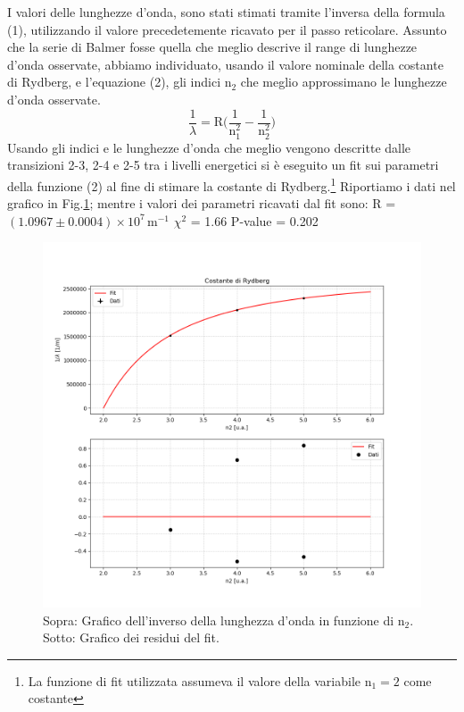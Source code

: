 \documentclass[10pt,a4paper]{article}
\begin{document}
\noindent I valori delle lunghezze d'onda, sono stati stimati tramite l'inversa della formula (1), utilizzando il valore precedetemente ricavato per il passo reticolare. \newline
Assunto che la serie di Balmer fosse quella che meglio descrive il range di lunghezze d'onda osservate, abbiamo individuato, usando il valore nominale della costante di Rydberg, e l'equazione (2), gli indici $\mathrm{n_2}$ che meglio approssimano le lunghezze d'onda osservate.
\begin{equation}
    \frac{1}{\lambda}=\mathrm{R}\biggl(\frac{1}{\mathrm{n_1^2}} - \frac{1}{\mathrm{n_2^2}}\biggr)
\end{equation}
Usando gli indici e le lunghezze d'onda che meglio vengono descritte dalle transizioni 2-3, 2-4 e 2-5 tra i livelli energetici si è eseguito un fit sui parametri della funzione (2) al fine di stimare la costante di Rydberg.\footnote{La funzione di fit utilizzata assumeva il valore della variabile $\mathrm{n}_1 = 2$ come costante} Riportiamo i dati nel grafico in Fig.\ref{fig:rydberg}; mentre i valori dei parametri ricavati dal fit sono:\newline\newline
    R = $(1.0967 \pm 0.0004)\times{10^7} \, \mathrm{m^{-1}}$\newline
    $\chi^2$ = 1.66\newline
    P-value = 0.202\newline
\begin{figure}[h]
    \centering
    \includegraphics[scale = 0.35]{fig_rydberg.png}
    \caption{\small Sopra: Grafico dell'inverso della lunghezza d'onda in funzione di $\mathrm{n}_2$. Sotto: Grafico dei residui del fit.}
    \label{fig:rydberg}
\end{figure}
\end{document}
